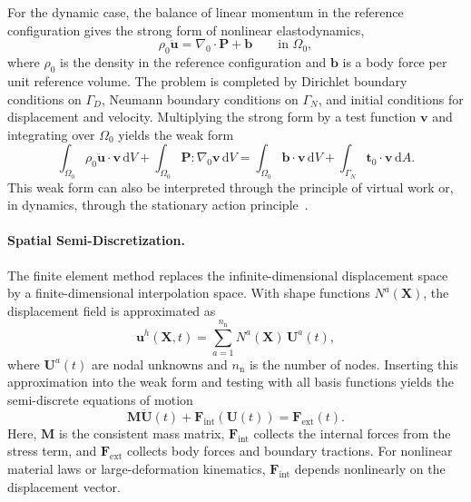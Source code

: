 For the dynamic case, the balance of linear momentum in the reference configuration gives the strong form of nonlinear elastodynamics,
\begin{equation}
    \rho_0 \ddot{\mathbf{u}}
    =
    \nabla_0 \cdot \mathbf{P} + \mathbf{b}
    \qquad \text{in } \Omega_0 ,
    \label{eq:fem_strong_elastodynamics}
\end{equation}
where $\rho_0$ is the density in the reference configuration and $\mathbf{b}$ is a body force per unit reference volume.
The problem is completed by Dirichlet boundary conditions on $\Gamma_D$, Neumann boundary conditions on $\Gamma_N$, and initial conditions for displacement and velocity.
Multiplying the strong form by a test function $\mathbf{v}$ and integrating over $\Omega_0$ yields the weak form
\begin{equation}
    \int_{\Omega_0} \rho_0 \ddot{\mathbf{u}}\cdot\mathbf{v}\,\mathrm{d}V
    +
    \int_{\Omega_0} \mathbf{P}:\nabla_0 \mathbf{v}\,\mathrm{d}V
    =
    \int_{\Omega_0} \mathbf{b}\cdot\mathbf{v}\,\mathrm{d}V
    +
    \int_{\Gamma_N} \mathbf{t}_0\cdot\mathbf{v}\,\mathrm{d}A .
    \label{eq:fem_weak_elastodynamics}
\end{equation}
This weak form can also be interpreted through the principle of virtual work or, in dynamics, through the stationary action principle~\cite{kochmann_introduction_2025}.

\paragraph{Spatial Semi-Discretization.}
The finite element method replaces the infinite-dimensional displacement space by a finite-dimensional interpolation space.
With shape functions $N^a(\mathbf{X})$, the displacement field is approximated as
\begin{equation}
    \mathbf{u}^h(\mathbf{X},t)
    =
    \sum_{a=1}^{n_{\mathrm{n}}}
    N^a(\mathbf{X})\,\mathbf{U}^a(t),
    \label{eq:fem_interpolation}
\end{equation}
where $\mathbf{U}^a(t)$ are nodal unknowns and $n_{\mathrm{n}}$ is the number of nodes.
Inserting this approximation into the weak form and testing with all basis functions yields the semi-discrete equations of motion~\cite{kochmann_introduction_2025}
\begin{equation}
    \mathbf{M}\ddot{\mathbf{U}}(t)
    +
    \mathbf{F}_{\mathrm{int}}(\mathbf{U}(t))
    =
    \mathbf{F}_{\mathrm{ext}}(t).
    \label{eq:fem_semidiscrete}
\end{equation}
Here, $\mathbf{M}$ is the consistent mass matrix, $\mathbf{F}_{\mathrm{int}}$ collects the internal forces from the stress term, and $\mathbf{F}_{\mathrm{ext}}$ collects body forces and boundary tractions.
For nonlinear material laws or large-deformation kinematics, $\mathbf{F}_{\mathrm{int}}$ depends nonlinearly on the displacement vector.

